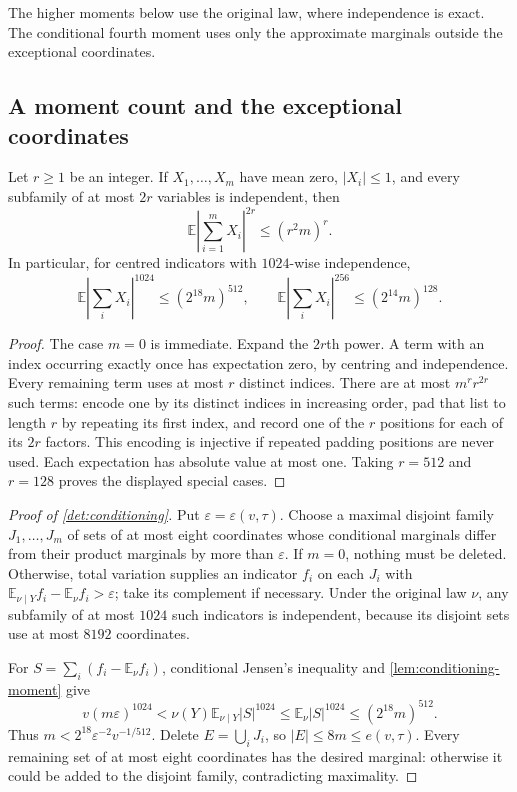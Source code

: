 \documentclass[11pt]{article} \usepackage[utf8]{inputenc}
\theoremstyle{plain} \newtheorem{theorem}{Theorem}[section]
\theoremstyle{definition} \newaliascnt{definition}{theorem}
\begin{document}
The higher moments below use the original law, where independence is exact.
The conditional fourth moment uses only the approximate marginals outside
the exceptional coordinates.

\subsection{A moment count and the exceptional coordinates}

\begin{lemma}\label{lem:conditioning-moment}
Let $r\ge1$ be an integer. If $X_1,\ldots,X_m$ have mean zero,
$|X_i|\le1$, and every subfamily of at most $2r$ variables is independent, then
\[
\mathbb E\left|\sum_{i=1}^m X_i\right|^{2r}\le(r^2m)^r.
\]
In particular, for centred indicators with $1024$-wise independence,
\[
\mathbb E\left|\sum_iX_i\right|^{1024}\le(2^{18}m)^{512},
\qquad
\mathbb E\left|\sum_iX_i\right|^{256}\le(2^{14}m)^{128}.
\]
\end{lemma}
\begin{proof}
The case $m=0$ is immediate. Expand the $2r$th power. A term with an index
occurring exactly once has expectation zero, by centring and independence.
Every remaining term uses at most $r$ distinct indices. There are at most
$m^rr^{2r}$ such terms: encode one by its distinct indices in increasing
order, pad that list to length $r$ by repeating its first index, and record
one of the $r$ positions for each of its $2r$ factors. This encoding is
injective if repeated padding positions are never used. Each expectation
has absolute value at most one. Taking $r=512$ and $r=128$ proves the
displayed special cases.
\end{proof}

\begin{proof}[Proof of \cref{det:conditioning}]
Put $\varepsilon=\varepsilon(v,\tau)$. Choose a maximal disjoint family
$J_1,\ldots,J_m$ of sets of at most eight coordinates whose conditional
marginals differ from their product marginals by more than $\varepsilon$.
If $m=0$, nothing must be deleted. Otherwise, total variation supplies an
indicator $f_i$ on each $J_i$ with
$\mathbb E_{\nu\mid Y}f_i-\mathbb E_\nu f_i>\varepsilon$; take its complement
if necessary. Under the original law $\nu$, any subfamily of at most $1024$
such indicators is independent, because its disjoint sets use at most
$8192$ coordinates.

For $S=\sum_i(f_i-\mathbb E_\nu f_i)$, conditional Jensen's inequality and
\cref{lem:conditioning-moment} give
\[
v(m\varepsilon)^{1024}
<\nu(Y)\mathbb E_{\nu\mid Y}|S|^{1024}
\le\mathbb E_\nu|S|^{1024}
\le(2^{18}m)^{512}.
\]
Thus $m<2^{18}\varepsilon^{-2}v^{-1/512}$.
Delete $E=\bigcup_iJ_i$, so $|E|\le8m\le e(v,\tau)$. Every remaining set of
at most eight coordinates has the desired marginal: otherwise it could be
added to the disjoint family, contradicting maximality.
\end{proof}
\end{document}
